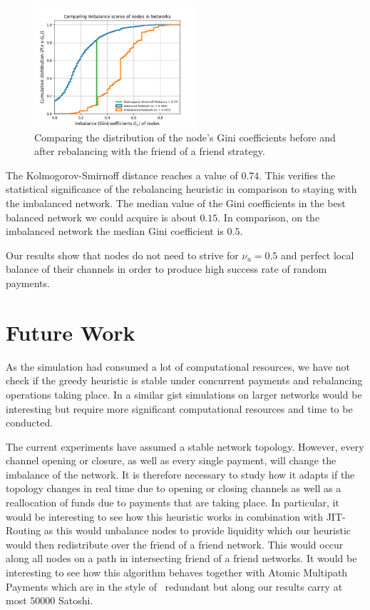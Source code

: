 \documentclass[conference]{IEEEtran}
\begin{document}
\begin{figure}
 \centering
 \includegraphics[width=6cm]{code/vs/fig/comparison distribution of Ginicoefficients.png}
 \caption{Comparing the distribution of the node's Gini coefficients before and after rebalancing with the friend of a friend strategy.}
 \label{fig:cdf_gini}
 \end{figure}

The Kolmogorov-Smirnoff distance reaches a value of $0.74$.
This verifies the statistical significance of the rebalancing heuristic in comparison to staying with the imbalanced network.
The median value of the Gini coefficients in the best balanced network we could acquire is about $0.15$.
In comparison, on the imbalanced network the median Gini coefficient is $0.5$.

Our results show that nodes do not need to strive for $\nu_u = 0.5$ and perfect local balance of their channels in order to produce high success rate of random payments.

\section{Future Work}
\label{sec:future}

As the simulation had consumed a lot of computational resources, we have not check if the greedy heuristic is stable under concurrent payments and rebalancing operations taking place.
In a similar gist simulations on larger networks would be interesting but require more significant computational resources and time to be conducted.

The current experiments have assumed a stable network topology. 
However, every channel opening or closure, as well as every single payment, will change the imbalance of the network.
It is therefore necessary to study how it adapts if the topology changes in real time due to opening or closing channels as well as a reallocation of funds due to payments that are taking place.
In particular, it would be interesting to see how this heuristic works in combination with JIT-Routing as this would unbalance nodes to provide liquidity which our heuristic would then redistribute over the friend of a friend network.
This would occur along all nodes on a path in intersecting friend of a friend networks.
It would be interesting to see how this algorithm behaves together with Atomic Multipath Payments which are in the style of~\cite{bagaria2019boomerang} redundant but along our results carry at most $50000$ Satoshi. 
\end{document}
